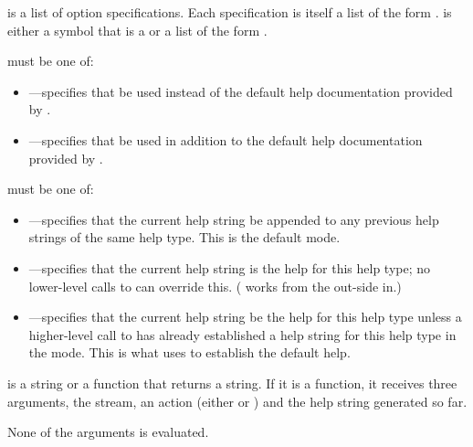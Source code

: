  is a list of option specifications.  Each specification is itself
a list of the form .   is either
a symbol that is a  or a list of the form .

 must be one of:

\begin{itemize}
\item {}---specifies that  be used instead of
the default help documentation provided by .

\item {}---specifies that  be used in addition to
the default help documentation provided by .
\end{itemize}

 must be one of:

\begin{itemize}
\item {}---specifies that the current help string be appended to any
previous help strings of the same help type. This is the default mode.

\item {}---specifies that the current help string is the help for
this help type; no lower-level calls to  can override this.
( works from the out-side in.)

\item {}---specifies that the current help string
be the help for this help type unless a higher-level call to
 has already established a help string for this help type
in the  mode. This is what  uses to establish the
default help.
\end{itemize}

 is a string or a function that returns a string.  If it is a
function, it receives three arguments, the stream, an action (either 
or ) and the help string generated so far.

None of the arguments is evaluated. 
